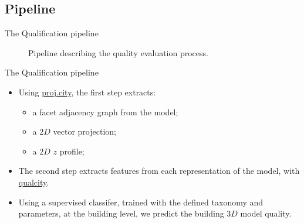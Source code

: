 \documentclass{beamer}
\begin{document}
        \subsection{Pipeline}
            \begin{frame}{The Qualification pipeline}
                \begin{figure}
                    
                    \caption{\label{fig::pipeline} Pipeline describing the quality evaluation process.}
                \end{figure}
            \end{frame}
            \begin{frame}{The Qualification pipeline}
                \begin{itemize}[label=$\blacktriangleright$, font=\color{IGNGreen}]
                    \item<1-> Using \href{https://github.com/ethiy/proj.city}{\textcolor{IGNGreen}{proj.city}}, the first step extracts:
                    \begin{itemize}[label=--]
                        \item<2-> a facet adjacency graph from the model;
                        \item<2-> a $2D$ vector projection;
                        \item<2-> a $2D$ $z$ profile;
                    \end{itemize}
                    \item<3-> The second step extracts features from each representation of the model, with \href{https://github.com/ethiy/qualcity}{\textcolor{IGNGreen}{qualcity}}.
                    \item<4-> Using a \textcolor{IGNDarkOrange}{supervised classifer}, trained with the defined \textcolor{IGNDarkOrange}{taxonomy and parameters}, at the \textcolor{IGNDarkOrange}{building level}, we \textcolor{IGNDarkOrange}{predict} the building $3D$ model quality.
                \end{itemize}
            \end{frame}
\end{document}
